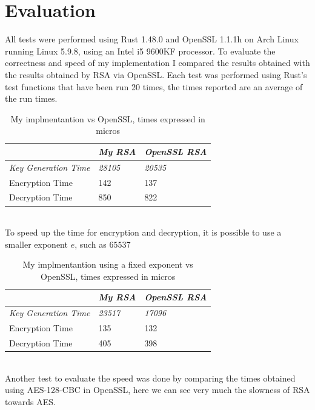 \documentclass[11pt]{article}
\begin{document}
\section{Evaluation}
All tests were performed using Rust 1.48.0 and OpenSSL \cite{openssl} 1.1.1h on Arch Linux running Linux 5.9.8, using an Intel i5 9600KF processor.
To evaluate the correctness and speed of my implementation I compared the results obtained with the results obtained by RSA via OpenSSL.
Each test was performed using Rust's test functions that have been run 20 times, the times reported are an average of the run times.
\begin{table}[h!]
  \centering
  \begin{tabular}{|l|l|l|}
    \hline
    \textit{}                    & \textit{My RSA} & \textit{OpenSSL RSA} \\ \hline
    \textit{Key Generation Time} & \textit{28105}  & \textit{20535}       \\ \hline
    Encryption Time              & 142             & 137                  \\ \hline
    Decryption Time              & 850             & 822                  \\ \hline
  \end{tabular}
  \caption{My implmentantion vs OpenSSL, times expressed in micros}
\end{table}
\\
To speed up the time for encryption and decryption, it is possible to use a smaller exponent $e$, such as $65537$
\begin{table}[h!]
  \centering
  \begin{tabular}{|l|l|l|}
    \hline
    \textit{}                    & \textit{My RSA} & \textit{OpenSSL RSA} \\ \hline
    \textit{Key Generation Time} & \textit{23517}  & \textit{17096}       \\ \hline
    Encryption Time              & 135             & 132                  \\ \hline
    Decryption Time              & 405             & 398                  \\ \hline
  \end{tabular}
  \caption{My implmentantion using a fixed exponent vs OpenSSL, times expressed in micros}
\end{table}
\\
Another test to evaluate the speed was done by comparing the times obtained using AES-128-CBC in OpenSSL,
here we can see very much the slowness of RSA towards AES.
\end{document}

